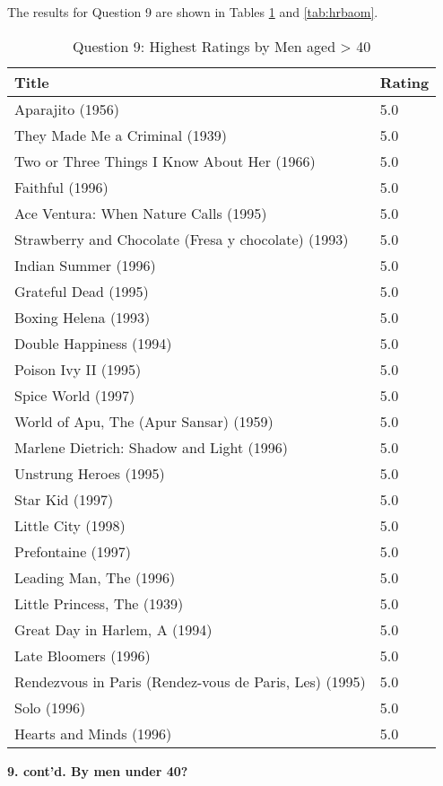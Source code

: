 The results for Question 9 are shown in Tables \ref{tab:hrbom} and \ref{tab:hrbaom}.

\clearpage

\begin{table}[h!]
\centering
\begin{tabular}{| l | l |}
\hline
Title & Rating \\
\hline
Aparajito (1956) & 5.0 \\
They Made Me a Criminal (1939) & 5.0 \\
Two or Three Things I Know About Her (1966) & 5.0 \\
Faithful (1996) & 5.0 \\
Ace Ventura: When Nature Calls (1995) & 5.0 \\
Strawberry and Chocolate (Fresa y chocolate) (1993) & 5.0 \\
Indian Summer (1996) & 5.0 \\
Grateful Dead (1995) & 5.0 \\
Boxing Helena (1993) & 5.0 \\
Double Happiness (1994) & 5.0 \\
Poison Ivy II (1995) & 5.0 \\
Spice World (1997) & 5.0 \\
World of Apu, The (Apur Sansar) (1959) & 5.0 \\
Marlene Dietrich: Shadow and Light (1996)  & 5.0 \\
Unstrung Heroes (1995) & 5.0 \\
Star Kid (1997) & 5.0 \\
Little City (1998) & 5.0 \\
Prefontaine (1997) & 5.0 \\
Leading Man, The (1996) & 5.0 \\
Little Princess, The (1939) & 5.0 \\
Great Day in Harlem, A (1994) & 5.0 \\
Late Bloomers (1996) & 5.0 \\
Rendezvous in Paris (Rendez-vous de Paris, Les) (1995) & 5.0 \\
Solo (1996) & 5.0 \\
Hearts and Minds (1996) & 5.0 \\
\hline
\end{tabular}
\caption{Question 9: Highest Ratings by Men aged > 40}
\label{tab:hrbom}
\end{table}

\clearpage

\textbf{9. cont'd. By men under 40?}\\

